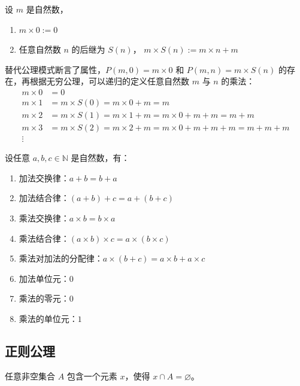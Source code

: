 \begin{definition}[自然数的乘法]
    设 $m$ 是自然数，
    \begin{enumerate}
        \item $ m\times 0:=0 $
        \item 任意自然数 $ n $ 的后继为 $ S(n) $， $m\times S(n):=m\times n+m$
    \end{enumerate}
\end{definition}

\begin{note}
     替代公理模式断言了属性，$P(m,0)=m\times 0$ 和 $P(m,n)=m\times S(n)$ 的存在，再根据无穷公理，可以递归的定义任意自然数 $m$ 与 $n$ 的乘法：
     \begin{align*}
        m\times 0 &= 0\\
        m\times 1 &= m\times S(0) = m\times 0 + m = m\\
        m\times 2 &= m\times S(1) = m\times 1 + m = m\times 0 + m + m= m + m\\
        m\times 3 &= m\times S(2) = m\times 2 + m=  m\times 0 + m + m + m = m + m + m\\
        \vdots
    \end{align*}
\end{note}
\vspace{1em}

\begin{proposition}[自然数的性质]
    设任意 $a,b,c\in\mathbb{N}$ 是自然数，有：
    \begin{enumerate}
        \item 加法交换律：$ a+b = b+a $
        \item 加法结合律：$ (a+b)+c=a+(b+c) $
        \item 乘法交换律：$ a\times b = b\times a $
        \item 乘法结合律：$ (a\times b)\times c=a\times (b\times c) $
        \item 乘法对加法的分配律：$ a\times (b+ c)=a\times b + a\times c $
        \item 加法单位元：$0$
        \item 乘法的零元：$0$
        \item 乘法的单位元：$1$
    \end{enumerate}
\end{proposition}
\vspace{1em}

\subsection{正则公理}
\begin{axiom}
    任意非空集合 $ A $ 包含一个元素 $ x $，使得 $ x\cap A = \varnothing $。
\end{axiom}

